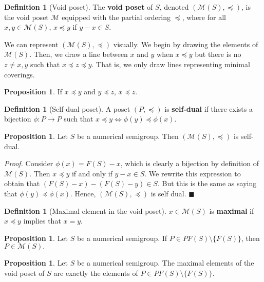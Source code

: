 \documentclass{article}
\theoremstyle{definition}
\theoremstyle{definition}
\newtheorem{defn}[thm]{Definition}
\theoremstyle{definition}
\newtheorem{prop}[thm]{Proposition}
\begin{document}
\begin{defn}[Void poset]
    The \textbf{void poset} of $S$, denoted $(\mathcal{M}(S), \preceq)$, is the void poset $\mathcal{M}$ equipped with the partial ordering $\preceq$, where for all $x, y \in \mathcal{M}(S)$, $x \preceq y$ if $y-x \in S.$

    We can represent $(\mathcal{M}(S), \preceq)$ visually. We begin by drawing the elements of $\mathcal{M}(S)$. Then, we draw a line between $x$ and $y$ when $x\preceq y$ but there is no $z \neq x, y$ such that $x\preceq z \preceq y$. That is, we only draw lines representing minimal coverings. 
\end{defn}

\begin{prop}
    If $x \preceq y$ and $y \preceq z$, $x \preceq z$.
\end{prop}


\begin{defn}[Self-dual poset]
    A poset $(P, \preceq)$ is \textbf{self-dual} if there exists a bijection $\phi : P \rightarrow P$ such that $x \preceq y \iff \phi(y) \preceq \phi(x)$.
    
\end{defn}

\begin{prop}
    Let $S$ be a numerical semigroup. Then $(\mathcal{M}(S), \preceq)$ is self-dual.
    
    \textit{Proof.} Consider $\phi(x) = F(S) - x$, which is clearly a bijection by definition of $\mathcal{M}(S)$. Then $x \preceq y$ if and only if $y-x \in S$. We rewrite this expression to obtain that $(F(S) - x) - (F(S) -y) \in S$. But this is the same as saying that $\phi(y) \preceq \phi(x)$. Hence, $(\mathcal{M}(S), \preceq)$ is self dual. $\blacksquare$
\end{prop}

\begin{defn}[Maximal element in the void poset]
    $x \in \mathcal{M}(S)$ is \textbf{maximal} if $x \preceq y$ implies that $x = y$.
\end{defn}

\begin{prop}
    Let $S$ be a numerical semigroup. If $P\in PF(S) \setminus \{F(S)\}$, then $P \in \mathcal{M}(S).$
\end{prop}

\begin{prop}
    Let $S$ be a numerical semigroup. The maximal elements of the void poset of $S$ are exactly the elements of $P\in PF(S) \setminus \{F(S)\}$.
\end{prop}
\end{document}
